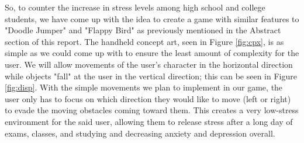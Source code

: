\documentclass[12pt]{article}
\begin{document}
So, to counter the increase in stress levels among high school and college students, we have come up with the idea to create a game with similar features to "Doodle Jumper" and "Flappy Bird" as previously mentioned in the Abstract section of this report. The handheld concept art, seen in Figure \ref{fig:cpx}, is as simple as we could come up with to ensure the least amount of complexity for the user. We will allow movements of the user's character in the horizontal direction while objects "fall" at the user in the vertical direction; this can be seen in Figure \ref{fig:disp}. With the simple movements we plan to implement in our game, the user only has to focus on which direction they would like to move (left or right) to evade the moving obstacles coming toward them. This creates a very low-stress environment for the said user, allowing them to release stress after a long day of exams, classes, and studying and decreasing anxiety and depression overall.




\end{document}
